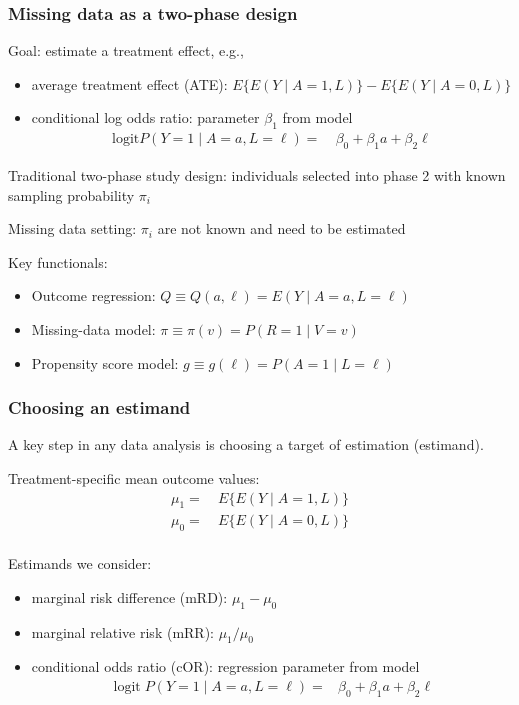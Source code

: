 \documentclass[10pt, table]{beamer}
\DeclareMathOperator{\logit}{logit}
\begin{document}
\begin{frame} \frametitle{Missing data as a two-phase design}
Goal: estimate a treatment effect, e.g.,\vspace{-.4cm}
\begin{itemize}
  \item average treatment effect (ATE): $E\{E(Y \mid A = 1, L)\} - E\{E(Y \mid A = 0, L)\}$
  \item conditional log odds ratio: parameter $\beta_1$ from model 
  \begin{align*}
    \text{logit} P(Y = 1 \mid A = a, L = \ell) =& \ \beta_0 + \beta_1 a + \beta_2 \ell
  \end{align*}
\end{itemize} \pause

Traditional two-phase study design: individuals selected into phase 2 with known sampling probability $\pi_i$

Missing data setting: $\pi_i$ are not known and need to be estimated \pause

Key functionals: \vspace{-0.4cm}
\begin{itemize}
  \item Outcome regression: $Q \equiv Q(a,\ell) = E(Y \mid A = a, L = \ell)$
  \item Missing-data model: $\pi \equiv \pi(v) = P(R = 1 \mid V = v)$
  \item Propensity score model: $g \equiv g(\ell) = P(A = 1 \mid L = \ell)$
\end{itemize}

\end{frame}

\begin{frame} \frametitle{Choosing an estimand}

A key step in any data analysis is choosing a target of estimation (estimand).

Treatment-specific mean outcome values:
\begin{align*}
  \mu_1 =& \ E\{E(Y \mid A = 1, L)\} \\
  \mu_0 =& \ E\{E(Y \mid A = 0, L)\} \\
\end{align*}\vspace{-1cm}

Estimands we consider:\vspace{-0.4cm}
\begin{itemize}
  \item marginal risk difference (mRD): $\mu_1 - \mu_0$
  \item marginal relative risk (mRR): $\mu_1/\mu_0$
  \item conditional odds ratio (cOR): regression parameter from model
    \begin{align*}
      \logit P(Y = 1 \mid A = a, L = \ell) =& \beta_0 + \beta_1 a + \beta_2 \ell
    \end{align*}
\end{itemize}

\end{frame}
\end{document}
